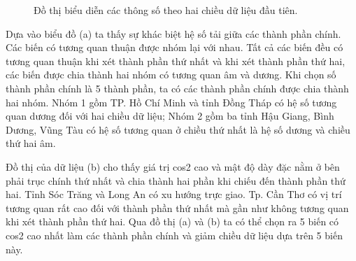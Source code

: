 \documentclass[../thesis.tex]{subfiles}
\begin{document}
\begin{landscape}
		\begin{figure}[H]
		\centering
		\caption{Đồ thị biểu diễn các thông số theo hai chiều dữ liệu đầu tiên.}
	\end{figure}

Dựa vào biểu đồ (a) ta thấy sự khác biệt hệ số tải giữa các thành phần chính. Các biến có tương quan thuận được nhóm lại với nhau. Tất cả các biến đều có tương quan thuận khi xét thành phần thứ nhất và khi xét thành phần thứ hai, các biến được chia thành hai nhóm có tương quan âm và dương. Khi chọn số thành phần chính là 5 thành phần, ta có các thành phần chính được chia thành hai nhóm. Nhóm 1 gồm TP. Hồ Chí Minh và tỉnh Đồng Tháp có hệ số tương quan dương đối với hai chiều dữ liệu; Nhóm 2 gồm ba tỉnh Hậu Giang, Bình Dương, Vũng Tàu có hệ số tương quan ở chiều thứ nhất là hệ số dương và chiều thứ hai âm. 

Đồ thị của dữ liệu (b) cho thấy giá trị cos2 cao và mật độ dày đặc nằm ở bên phải trục chính thứ nhất và chia thành hai phần khi chiếu đến thành phần thứ hai. Tỉnh Sóc Trăng và Long An có xu hướng trực giao. Tp. Cần Thơ có vị trí tương quan rất cao đối với thành phần thứ nhất mà gần như không tương quan khi xét thành phần thứ hai. Qua đồ thị (a) và (b) ta có thể chọn ra 5 biến có cos2 cao nhất làm các thành phần chính và giảm chiều dữ liệu dựa trên 5 biến này. 
	
\end{landscape}
\end{document}

